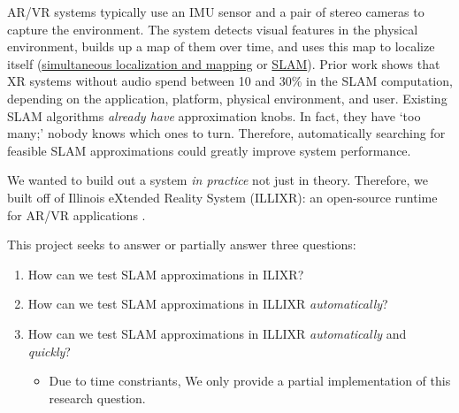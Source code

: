 AR/VR systems typically use an IMU sensor and a pair of stereo cameras to capture the environment. The system detects visual features in the physical environment, builds up a map of them over time, and uses this map to localize itself (\underline{simultaneous localization and mapping} or \underline{SLAM}). Prior work shows that XR systems without audio spend between 10 and 30\% in the SLAM computation, depending on the application, platform, physical environment, and user\cite{huzaifa2020exploring}. Existing SLAM algorithms \textit{already have} approximation knobs. In fact, they have `too many;' nobody knows which ones to turn. Therefore, automatically searching for feasible SLAM approximations could greatly improve system performance.


We wanted to build out a system \textit{in practice} not just in theory. Therefore, we built off of Illinois eXtended Reality System (ILLIXR): an open-source runtime for AR/VR applications .

This project seeks to answer or partially answer three questions:

\begin{enumerate}[label={\textbf{R.Q. {\theenumi}}}]
\item How can we test SLAM approximations in ILIXR?
\item How can we test SLAM approximations in ILLIXR \textit{automatically}?
\item How can we test SLAM approximations in ILLIXR \textit{automatically} and \textit{quickly}?
  \begin{itemize}
  \item Due to time constriants, We only provide a partial implementation of this research question.
  \end{itemize}
\end{enumerate}
